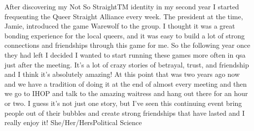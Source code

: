 {After discovering my Not So StraightTM identity in my second year I started 
frequenting the Queer Straight Alliance every week. The president at the time, 
Jamie, introduced the game Warewolf to the group. I thought it was a great 
bonding experience for the local queers, and it was easy to build a lot of 
strong connections and friendships through this game for me. So the following 
year once they had left I decided I wanted to start running these games more 
often in qsa just after the meeting. It's a lot of crazy stories of betrayal, 
trust, and friendship and I think it's absolutely amazing! At this point that 
was two years ago now and we have a tradition of doing it at the end of almost 
every meeting and then we go to IHOP and talk to the amazing waitress and hang 
out there for an hour or two. I guess it's not just one story, but I've seen 
this continuing event bring people out of their bubbles and create strong 
friendships that have lasted and I really enjoy it!}
{She/Her/Hers}{Political Science}{}

